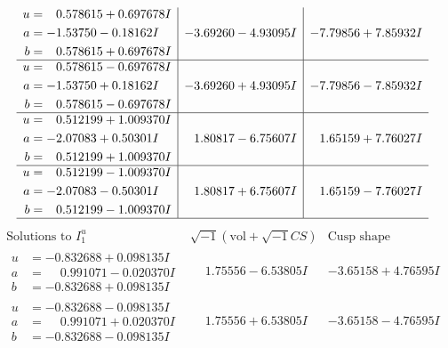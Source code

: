 \documentclass[1p]{elsarticle_modified}
\theoremstyle{definition}
\newcommand{\I}{\sqrt{-1}}
\begin{document}
$$\begin{array}{c|c|c}
\begin{aligned}
u &= \phantom{-}0.578615 + 0.697678 I \\
a &= -1.53750 - 0.18162 I \\
b &= \phantom{-}0.578615 + 0.697678 I\end{aligned}
 & -3.69260 - 4.93095 I & -7.79856 + 7.85932 I \\ \hline\begin{aligned}
u &= \phantom{-}0.578615 - 0.697678 I \\
a &= -1.53750 + 0.18162 I \\
b &= \phantom{-}0.578615 - 0.697678 I\end{aligned}
 & -3.69260 + 4.93095 I & -7.79856 - 7.85932 I \\ \hline\begin{aligned}
u &= \phantom{-}0.512199 + 1.009370 I \\
a &= -2.07083 + 0.50301 I \\
b &= \phantom{-}0.512199 + 1.009370 I\end{aligned}
 & \phantom{-}1.80817 - 6.75607 I & \phantom{-}1.65159 + 7.76027 I \\ \hline\begin{aligned}
u &= \phantom{-}0.512199 - 1.009370 I \\
a &= -2.07083 - 0.50301 I \\
b &= \phantom{-}0.512199 - 1.009370 I\end{aligned}
 & \phantom{-}1.80817 + 6.75607 I & \phantom{-}1.65159 - 7.76027 I\\
 \hline 
 \end{array}$$\newpage$$\begin{array}{c|c|c}  
\text{Solutions to }I^u_{1}& \I (\text{vol} + \sqrt{-1}CS) & \text{Cusp shape}\\
 \hline 
\begin{aligned}
u &= -0.832688 + 0.098135 I \\
a &= \phantom{-}0.991071 - 0.020370 I \\
b &= -0.832688 + 0.098135 I\end{aligned}
 & \phantom{-}1.75556 - 6.53805 I & -3.65158 + 4.76595 I \\ \hline\begin{aligned}
u &= -0.832688 - 0.098135 I \\
a &= \phantom{-}0.991071 + 0.020370 I \\
b &= -0.832688 - 0.098135 I\end{aligned}
 & \phantom{-}1.75556 + 6.53805 I & -3.65158 - 4.76595 I \\ \hline\begin{aligned}

\end{aligned}
\end{array}$$
\end{document}
